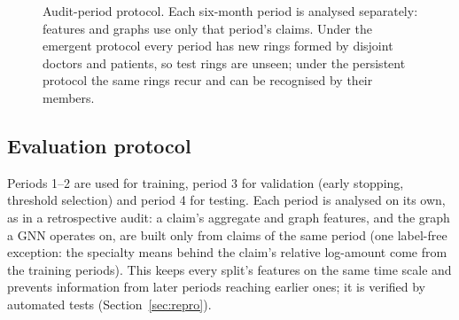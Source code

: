 \documentclass[pdflatex,sn-vancouver-num]{sn-jnl}
\begin{document}
\begin{figure}[t]
\centering
{}
\caption{Audit-period protocol. Each six-month period is analysed separately:
features and graphs use only that period's claims. Under the emergent
protocol every period has new rings formed by disjoint doctors and patients,
so test rings are unseen; under the persistent protocol the same rings recur
and can be recognised by their members.}
\label{fig:protocol}
\end{figure}

\subsection{Evaluation protocol}\label{sec:protocol}
Periods 1--2 are used for training, period 3 for validation (early stopping,
threshold selection) and period 4 for testing. Each period is analysed on its
own, as in a retrospective audit: a claim's aggregate and graph features, and
the graph a GNN operates on, are built only from claims of the same period
(one label-free exception: the specialty means behind the claim's relative
log-amount come from the training periods).
This keeps every split's features on the same time scale and prevents
information from later periods reaching earlier ones; it is verified by
automated tests (Section~\ref{sec:repro}).
\end{document}

